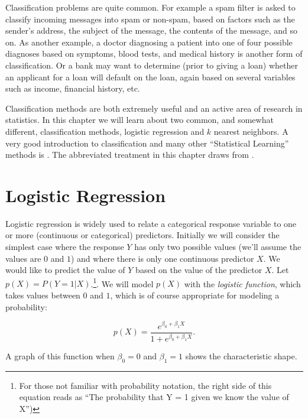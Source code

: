 \documentclass[
]{krantz}
\begin{document}
Classification problems are quite common. For example a spam filter is asked to classify incoming messages into spam or non-spam, based on factors such as the sender's address, the subject of the message, the contents of the message, and so on. As another example, a doctor diagnosing a patient into one of four possible diagnoses based on symptoms, blood tests, and medical history is another form of classification. Or a bank may want to determine (prior to giving a loan) whether an applicant for a loan will default on the loan, again based on several variables such as income, financial history, etc.

Classification methods are both extremely useful and an active area of research in statistics. In this chapter we will learn about two common, and somewhat different, classification methods, logistic regression and \(k\) nearest neighbors. A very good introduction to classification and many other ``Statistical Learning'' methods is \citet{JamesEtAl}. The abbreviated treatment in this chapter draws from \citet{JamesEtAl}.

\hypertarget{logistic-regression}{%
\section{Logistic Regression}\label{logistic-regression}}

Logistic regression is widely used to relate a categorical response variable to one or more (continuous or categorical) predictors. Initially we will consider the simplest case where the response \(Y\) has only two possible values (we'll assume the values are \(0\) and \(1\)) and where there is only one continuous predictor \(X\). We would like to predict the value of \(Y\) based on the value of the predictor \(X\). Let \(p(X) = P(Y = 1 | X)\).\footnote{For those not familiar with probability notation, the right side of this equation reads as ``The probability that Y = 1 given we know the value of X'')}. We will model \(p(X)\) with the \emph{logistic function}, which takes values between \(0\) and \(1\), which is of course appropriate for modeling a probability:

\[
p(X) = \frac{e^{\beta_0 + \beta_1 X}}{1 + e^{\beta_0 + \beta_1 X}}.
\]

A graph of this function when \(\beta_0=0\) and \(\beta_1 = 1\) shows the characteristic shape.
\end{document}
